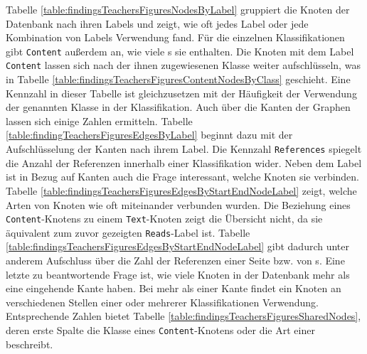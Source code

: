     Tabelle \ref{table:findingsTeachersFiguresNodesByLabel}
    gruppiert die Knoten der Datenbank nach ihren Labels und zeigt,
    wie oft jedes Label oder jede Kombination von Labels Verwendung fand.   
    Für die einzelnen Klassifikationen gibt \texttt{Content} außerdem an,
    wie viele {\contentFeature}s sie enthalten.
    Die Knoten mit dem Label \texttt{Content} lassen sich nach der ihnen zugewiesenen Klasse
    weiter aufschlüsseln, was in Tabelle \ref{table:findingsTeachersFiguresContentNodesByClass} geschieht.
    Eine Kennzahl in dieser Tabelle ist gleichzusetzen mit der Häufigkeit der Verwendung
    der genannten Klasse in der Klassifikation.
    Auch über die Kanten der Graphen lassen sich einige Zahlen ermitteln.
    Tabelle \ref{table:findingTeachersFiguresEdgesByLabel} beginnt dazu
    mit der Aufschlüsselung der Kanten nach ihrem Label.
    Die Kennzahl \texttt{References} spiegelt die Anzahl der Referenzen innerhalb einer Klassifikation wider.
    Neben dem Label ist in Bezug auf Kanten auch die Frage interessant,
    welche Knoten sie verbinden.
    Tabelle \ref{table:findingsTeachersFiguresEdgesByStartEndNodeLabel}
    zeigt, welche Arten von Knoten wie oft miteinander verbunden wurden.
    Die Beziehung eines \texttt{Content}-Knotens zu einem \texttt{Text}-Knoten
    zeigt die Übersicht nicht,
    da sie äquivalent zum zuvor gezeigten \texttt{Reads}-Label ist.
    Tabelle \ref{table:findingsTeachersFiguresEdgesByStartEndNodeLabel} gibt dadurch unter anderem Aufschluss über die Zahl der Referenzen
    einer Seite bzw. von {\contentFeature}s.
    Eine letzte zu beantwortende Frage ist,
    wie viele Knoten in der Datenbank mehr als eine eingehende Kante haben.
    Bei mehr als einer Kante findet ein Knoten an verschiedenen Stellen 
    einer oder mehrerer Klassifikationen Verwendung.
    Entsprechende Zahlen bietet Tabelle \ref{table:findingsTeachersFiguresSharedNodes},
    deren erste Spalte die Klasse eines \texttt{Content}-Knotens oder
    die Art einer {\resource} beschreibt.
